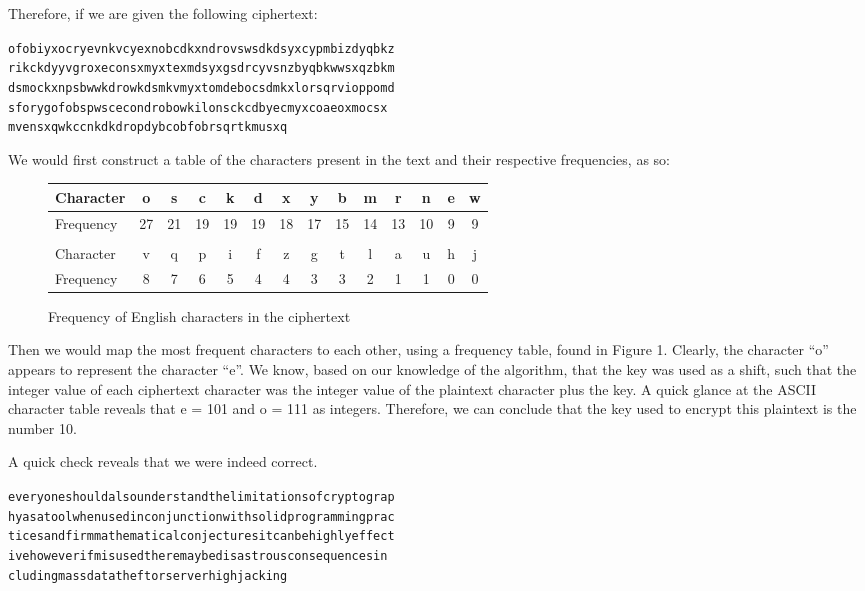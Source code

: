 \documentclass[12pt, a4paper, final]{report}
\begin{document}
\pagebreak
Therefore, if we are given the following ciphertext:

\begin{alltt}
ofobiyxocryevnkvcyexnobcdkxndrovswsdkdsyxcypmbizdyqbkz
rikckdyyvgroxeconsxmyxtexmdsyxgsdrcyvsnzbyqbkwwsxqzbkm
dsmockxnpsbwwkdrowkdsmkvmyxtomdebocsdmkxlorsqrvioppomd
sforygofobspwscecondrobowkilonsckcdbyecmyxcoaeoxmocsx
mvensxqwkccnkdkdropdybcobfobrsqrtkmusxq
\end{alltt}

We would first construct a table of the characters present in the text and
their respective frequencies, as so:

\begin{figure}[h]
\begin{center}
\begin{tabular}{l*{13}{c}}
\toprule
Character & o & s & c & k & d & x & y & b & m & r & n & e & w\\
\midrule
Frequency & 27 & 21 & 19 & 19 & 19 & 18 & 17 & 15 & 14 & 13 & 10 & 9 & 9\\
\bottomrule
\hfill\\
\toprule
Character & v & q & p & i & f & z & g & t & l & a & u & h & j\\
\midrule
Frequency & 8 & 7 & 6 & 5 & 4 & 4 & 3 & 3 & 2 & 1 & 1 & 0 & 0\\
\bottomrule
\end{tabular}
\end{center}
\caption{Frequency of English characters in the ciphertext}
\end{figure}

Then we would map the most frequent characters to each other, using a
frequency table, found in Figure 1.
Clearly, the character ``o'' appears to represent the character ``e''.
We know, based on our knowledge of the algorithm, that the key was used
as a shift, such that the integer value of each ciphertext character was the
integer value of the plaintext character plus the key. A quick glance at the
ASCII character table reveals that e = 101 and o = 111 as integers.
Therefore, we can conclude that the key used to encrypt this plaintext
is the number 10.

A quick check reveals that we were indeed correct.

\begin{alltt}
everyoneshouldalsounderstandthelimitationsofcryptograp
hyasatoolwhenusedinconjunctionwithsolidprogrammingprac
ticesandfirmmathematicalconjecturesitcanbehighlyeffect
ivehoweverifmisusedtheremaybedisastrousconsequencesin
cludingmassdatatheftorserverhighjacking
\end{alltt}
\end{document}
